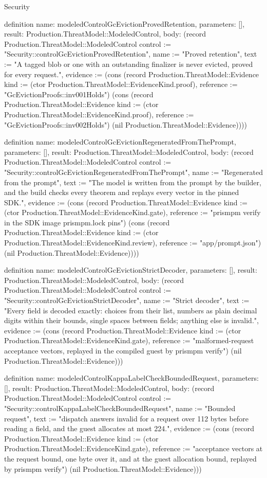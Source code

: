 \begin{lexlean}{Security}
\begin{semanticmodule}
definition{
  name: modeledControlGcEvictionProvedRetention,
  parameters: [],
  result: Production.ThreatModel::ModeledControl,
  body: (record Production.ThreatModel::ModeledControl {control := "Security::controlGcEvictionProvedRetention", name := "Proved retention", text := "A tagged blob or one with an outstanding finalizer is never evicted, proved for every request.", evidence := (cons (record Production.ThreatModel::Evidence {kind := (ctor Production.ThreatModel::EvidenceKind.proof), reference := "GcEvictionProofs::inv001Holds"}) (cons (record Production.ThreatModel::Evidence {kind := (ctor Production.ThreatModel::EvidenceKind.proof), reference := "GcEvictionProofs::inv002Holds"}) (nil Production.ThreatModel::Evidence)))})
}

definition{
  name: modeledControlGcEvictionRegeneratedFromThePrompt,
  parameters: [],
  result: Production.ThreatModel::ModeledControl,
  body: (record Production.ThreatModel::ModeledControl {control := "Security::controlGcEvictionRegeneratedFromThePrompt", name := "Regenerated from the prompt", text := "The model is written from the prompt by the builder, and the build checks every theorem and replays every vector in the pinned SDK.", evidence := (cons (record Production.ThreatModel::Evidence {kind := (ctor Production.ThreatModel::EvidenceKind.gate), reference := "prismpm verify in the SDK image prismpm.lock pins"}) (cons (record Production.ThreatModel::Evidence {kind := (ctor Production.ThreatModel::EvidenceKind.review), reference := "app/prompt.json"}) (nil Production.ThreatModel::Evidence)))})
}

definition{
  name: modeledControlGcEvictionStrictDecoder,
  parameters: [],
  result: Production.ThreatModel::ModeledControl,
  body: (record Production.ThreatModel::ModeledControl {control := "Security::controlGcEvictionStrictDecoder", name := "Strict decoder", text := "Every field is decoded exactly: choices from their list, numbers as plain decimal digits within their bounds, single spaces between fields; anything else is invalid.", evidence := (cons (record Production.ThreatModel::Evidence {kind := (ctor Production.ThreatModel::EvidenceKind.gate), reference := "malformed-request acceptance vectors, replayed in the compiled guest by prismpm verify"}) (nil Production.ThreatModel::Evidence))})
}

definition{
  name: modeledControlKappaLabelCheckBoundedRequest,
  parameters: [],
  result: Production.ThreatModel::ModeledControl,
  body: (record Production.ThreatModel::ModeledControl {control := "Security::controlKappaLabelCheckBoundedRequest", name := "Bounded request", text := "dispatch answers invalid for a request over 112 bytes before reading a field, and the guest allocates at most 224.", evidence := (cons (record Production.ThreatModel::Evidence {kind := (ctor Production.ThreatModel::EvidenceKind.gate), reference := "acceptance vectors at the request bound, one byte over it, and at the guest allocation bound, replayed by prismpm verify"}) (nil Production.ThreatModel::Evidence))})
}


\end{semanticmodule}
\end{lexlean}

